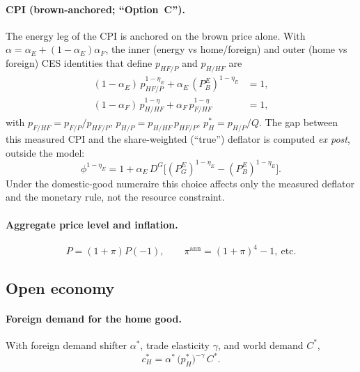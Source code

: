 \documentclass[11pt,a4paper]{article}
\newcommand{\DG}{D^{G}}
\newcommand{\PEB}{P^{E}_{B}}
\newcommand{\PEG}{P^{E}_{G}}
\begin{document}
\paragraph{CPI (brown-anchored; ``Option~C'').} The energy leg of the CPI is
anchored on the brown price alone. With $\alpha=\alpha_E+(1-\alpha_E)\alpha_F$,
the inner (energy vs home/foreign) and outer (home vs foreign) CES identities
that define $p_{HF/P}$ and $p_{H/HF}$ are
\begin{align}
(1-\alpha_E)\,p_{HF/P}^{1-\eta_E}+\alpha_E\,(\PEB)^{1-\eta_E}&=1, \label{eq:innernest}\\
(1-\alpha_F)\,p_{H/HF}^{1-\eta}+\alpha_F\,p_{F/HF}^{1-\eta}&=1, \label{eq:outernest}
\end{align}
with $p_{F/HF}=p_{F/P}/p_{HF/P}$, $p_{H/P}=p_{H/HF}\,p_{HF/P}$, $p_H^{*}=p_{H/P}/Q$.
The gap between this measured CPI and the share-weighted (``true'') deflator is
computed \emph{ex post}, outside the model:
\begin{equation}
\phi^{1-\eta_E}=1+\alpha_E\,\DG\bigl[(\PEG)^{1-\eta_E}-(\PEB)^{1-\eta_E}\bigr].
\end{equation}
Under the domestic-good numeraire this choice affects only the measured deflator
and the monetary rule, not the resource constraint.

\paragraph{Aggregate price level and inflation.}
\begin{equation}
P=(1+\pi)P(-1),\qquad
\pi^{\text{ann}}=(1+\pi)^4-1,\ \text{etc.}
\end{equation}

\subsection{Open economy}\label{sec:open}

\paragraph{Foreign demand for the home good.} With foreign demand shifter
$\alpha^{*}$, trade elasticity $\gamma$, and world demand $C^{*}$,
\begin{equation}
c_H^{*}=\alpha^{*}\,\bigl(p_H^{*}\bigr)^{-\gamma}\,C^{*}.
\end{equation}
\end{document}

